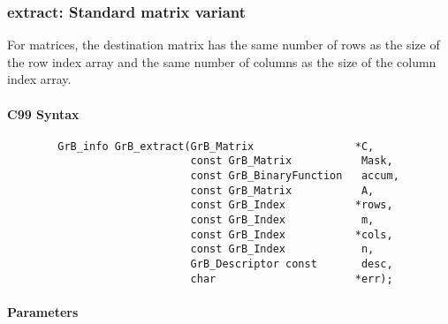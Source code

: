 
\subsubsection{{\sf extract}: Standard matrix variant}

For matrices, the destination matrix has
the same number of rows as the size of the row index array and the same
number of columns as the size of the column index array.

\paragraph{C99 Syntax}

\begin{verbatim}                 
        GrB_info GrB_extract(GrB_Matrix                *C,
                             const GrB_Matrix           Mask,
                             const GrB_BinaryFunction   accum,
                             const GrB_Matrix           A,
                             const GrB_Index           *rows,
                             const GrB_Index            m,
                             const GrB_Index           *cols,
                             const GrB_Index            n,
                             GrB_Descriptor const       desc,
                             char                      *err);
\end{verbatim}

\paragraph{Parameters}

